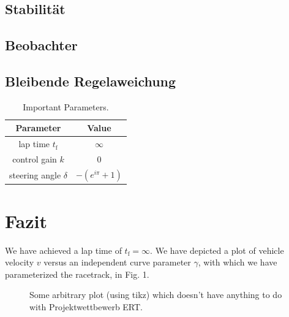 \documentclass[pdf]{ifacconf}
\begin{document}
	\subsection {Stabilität}


	\subsection {Beobachter}


	\subsection{Bleibende Regelaweichung}





\begin{table}[h]
\caption{Important Parameters.}
\label{table:working plan}
\centering
\begin{tabular}{|c|c|}
\hline
\bfseries Parameter & \bfseries Value \\ \hline \hline
lap time $t_{\text{f}}$ & $\infty$ \\ \hline
control gain $k$ & $0$ \\ \hline
steering angle $\delta$ & $-\left( e^{i \pi}+1\right)$ \\ \hline
 \end{tabular}
\end{table}

\section{Fazit}
We have achieved a lap time of $t_{\text{f}}=\infty$. We have depicted a plot of vehicle velocity $v$ versus an independent curve parameter $\gamma$, with which we have parameterized the racetrack, in Fig. 1. 

\begin{figure}[h] %
\begin{center}

\caption{Some arbitrary plot (using tikz) which doesn't have anything to do with Projektwettbewerb ERT.}
\label{fig1}
\end{center}
\end{figure}
\end{document}
